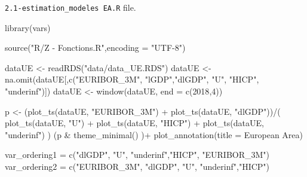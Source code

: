 \documentclass[
  10pt,
]{article}
\newenvironment{Shaded}{\begin{snugshade}}{\end{snugshade}}
\newcommand{\AttributeTok}[1]{\textcolor[rgb]{0.77,0.63,0.00}{#1}}
\newcommand{\DecValTok}[1]{\textcolor[rgb]{0.00,0.00,0.81}{#1}}
\newcommand{\FunctionTok}[1]{\textcolor[rgb]{0.00,0.00,0.00}{#1}}
\newcommand{\NormalTok}[1]{#1}
\newcommand{\OtherTok}[1]{\textcolor[rgb]{0.56,0.35,0.01}{#1}}
\newcommand{\SpecialCharTok}[1]{\textcolor[rgb]{0.00,0.00,0.00}{#1}}
\newcommand{\StringTok}[1]{\textcolor[rgb]{0.31,0.60,0.02}{#1}}
\begin{document}
\texttt{2.1-estimation\_modeles\ EA.R} file.

\begin{Shaded}
\begin{Highlighting}[]
\FunctionTok{library}\NormalTok{(vars)}

\FunctionTok{source}\NormalTok{(}\StringTok{"R/Z {-} Fonctions.R"}\NormalTok{,}\AttributeTok{encoding =} \StringTok{"UTF{-}8"}\NormalTok{)}

\NormalTok{dataUE }\OtherTok{\textless{}{-}} \FunctionTok{readRDS}\NormalTok{(}\StringTok{"data/data\_UE.RDS"}\NormalTok{)}
\NormalTok{dataUE }\OtherTok{\textless{}{-}} \FunctionTok{na.omit}\NormalTok{(dataUE[,}\FunctionTok{c}\NormalTok{(}\StringTok{"EURIBOR\_3M"}\NormalTok{, }\StringTok{"lGDP"}\NormalTok{,}\StringTok{"dlGDP"}\NormalTok{,}
                            \StringTok{"U"}\NormalTok{, }\StringTok{"HICP"}\NormalTok{, }\StringTok{"underinf"}\NormalTok{)])}
\NormalTok{dataUE }\OtherTok{\textless{}{-}} \FunctionTok{window}\NormalTok{(dataUE, }\AttributeTok{end =} \FunctionTok{c}\NormalTok{(}\DecValTok{2018}\NormalTok{,}\DecValTok{4}\NormalTok{))}

\NormalTok{p }\OtherTok{\textless{}{-}}\NormalTok{ (}\FunctionTok{plot\_ts}\NormalTok{(dataUE, }\StringTok{"EURIBOR\_3M"}\NormalTok{) }\SpecialCharTok{+}
          \FunctionTok{plot\_ts}\NormalTok{(dataUE, }\StringTok{"dlGDP"}\NormalTok{))}\SpecialCharTok{/}\NormalTok{(}
              \FunctionTok{plot\_ts}\NormalTok{(dataUE, }\StringTok{"U"}\NormalTok{) }\SpecialCharTok{+} 
                  \FunctionTok{plot\_ts}\NormalTok{(dataUE, }\StringTok{"HICP"}\NormalTok{) }\SpecialCharTok{+} 
                  \FunctionTok{plot\_ts}\NormalTok{(dataUE, }\StringTok{"underinf"}\NormalTok{)}
\NormalTok{              )}
\NormalTok{(p }\SpecialCharTok{\&} \FunctionTok{theme\_minimal}\NormalTok{() )}\SpecialCharTok{+} 
    \FunctionTok{plot\_annotation}\NormalTok{(}\AttributeTok{title =} \StringTok{\textquotesingle{}European Area\textquotesingle{}}\NormalTok{)}

\NormalTok{var\_ordering1 }\OtherTok{=} \FunctionTok{c}\NormalTok{(}\StringTok{"dlGDP"}\NormalTok{,}
                 \StringTok{"U"}\NormalTok{, }\StringTok{"underinf"}\NormalTok{,}\StringTok{"HICP"}\NormalTok{, }\StringTok{"EURIBOR\_3M"}\NormalTok{)}
\NormalTok{var\_ordering2 }\OtherTok{=} \FunctionTok{c}\NormalTok{(}\StringTok{"EURIBOR\_3M"}\NormalTok{, }\StringTok{"dlGDP"}\NormalTok{,}
                 \StringTok{"U"}\NormalTok{, }\StringTok{"underinf"}\NormalTok{,}\StringTok{"HICP"}\NormalTok{)}


\end{Highlighting}
\end{Shaded}
\end{document}
